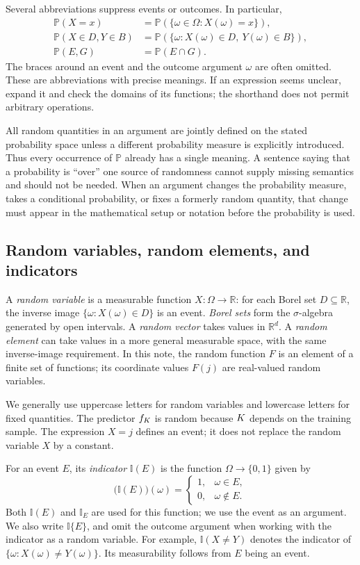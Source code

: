 \documentclass[11pt,twoside]{article}
\newcommand{\I}{\mathbb I}
\renewcommand{\P}{\mathbb P}
\theoremstyle{definition}
\theoremstyle{remark}
\begin{document}
Several abbreviations suppress events or outcomes. In particular,
\begin{align*}
\P(X=x)&=\P(\{\omega\in\Omega:X(\omega)=x\}),\\
\P(X\in D,Y\in B)
&=\P(\{\omega:X(\omega)\in D,\ Y(\omega)\in B\}),\\
\P(E,G)&=\P(E\cap G).
\end{align*}
The braces around an event and the outcome argument $\omega$ are often
omitted. These are abbreviations with precise meanings. If an expression
seems unclear, expand it and check the domains of its functions; the
shorthand does not permit arbitrary operations.

All random quantities in an argument are jointly defined on the stated
probability space unless a different probability measure is explicitly
introduced. Thus every occurrence of $\P$ already has a single meaning.
A sentence saying that a probability is ``over'' one source of randomness
cannot supply missing semantics and should not be needed. When an argument
changes the probability measure, takes a conditional probability, or fixes a
formerly random quantity, that change must appear in the mathematical setup
or notation before the probability is used.

\subsection{Random variables, random elements, and indicators}
A \emph{random variable} is a measurable function $X:\Omega\to\mathbb R$:
for each Borel set $D\subseteq\mathbb R$, the inverse image
$\{\omega:X(\omega)\in D\}$ is an event. \emph{Borel sets} form the
$\sigma$-algebra generated by open intervals. A \emph{random vector} takes
values in $\mathbb R^d$. A \emph{random element} can take values in a more
general measurable space, with the same inverse-image requirement. In this
note, the random function $F$ is an element of a finite set of functions;
its coordinate values $F(j)$ are real-valued random variables.

We generally use uppercase letters for random variables and lowercase
letters for fixed quantities. The predictor $f_{K}$ is random
because $K$ depends on the training sample. The expression $X=j$
defines an event; it does not replace the random variable $X$ by a constant.

For an event $E$, its \emph{indicator} $\I(E)$ is the function
$\Omega\to\{0,1\}$ given by
\[
\bigl(\I(E)\bigr)(\omega)=
\begin{cases}
1,&\omega\in E,\\
0,&\omega\notin E.
\end{cases}
\]
Both $\I(E)$ and $\I_E$ are used for this function; we use the event as an
argument. We also write $\I\{E\}$, and omit the outcome argument when
working with the indicator as a random variable. For example,
$\I(X\ne Y)$ denotes the indicator of $\{\omega:X(\omega)\ne Y(\omega)\}$.
Its measurability follows from $E$ being an event.
\end{document}

